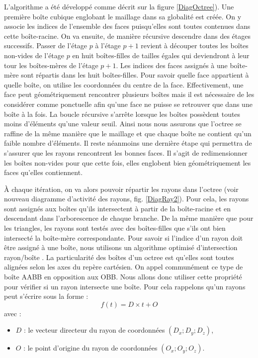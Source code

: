 L'algorithme a été développé comme décrit sur la figure \ref{DiagOctree}). Une première boîte cubique englobant le maillage dans sa globalité est créée. On y associe les indices de l'ensemble des faces puisqu'elles sont toutes contenues dans cette boîte-racine. On va ensuite, de manière récursive descendre dans des étages successifs. Passer de l'étage $p$ à l'étage $p+1$ revient à découper toutes les boîtes non-vides de l'étage $p$ en huit boîtes-filles de tailles égales qui deviendront à leur tour les boîtes-mères de l'étage $p+1$. Les indices des faces assignés à une boîte-mère sont répartis dans les huit boîtes-filles. Pour savoir quelle face appartient à quelle boîte, on utilise les coordonnées du centre de la face. Effectivement, une face peut géométriquement rencontrer plusieurs boîtes mais il est nécessaire de les considérer comme ponctuelle afin qu'une face ne puisse se retrouver que dans une boîte à la fois. La boucle récursive s'arrête lorsque les boîtes possèdent toutes moins d'éléments qu'une valeur seuil. Ainsi nous nous assurons que l'\gls{octree} se raffine de la même manière que le maillage et que chaque boîte ne contient qu'un faible nombre d'éléments. Il reste néanmoins une dernière étape qui permettra de s'assurer que les rayons rencontrent les bonnes faces. Il s'agit de redimensionner les boîtes non-vides pour que cette fois, elles englobent bien géométriquement les faces qu'elles contiennent.


À chaque itération, on va alors pouvoir répartir les rayons dans l'\gls{octree} (voir nouveau diagramme d'activité des rayons, fig. \ref{DiagRay2}). Pour cela, les rayons sont assignés aux boîtes qu'ils intersectent à partir de la boîte-racine et en descendant dans l'arborescence de chaque branche. De la même manière que pour les triangles, les rayons sont testés avec des boîtes-filles que s'ils ont bien intersecté la boîte-mère correspondante. Pour savoir si l'indice d'un rayon doit être assigné à une boîte, nous utilisons un algorithme optimisé d'intersection rayon/boîte \cite{AABB}. La particularité des boîtes d'un \gls{octree} est qu'elles sont toutes alignées selon les axes du repère cartésien. On appel communément ce type de boîte \gls{AABB} en opposition aux \gls{OBB}. Nous allons donc utiliser cette propriété pour vérifier si un rayon intersecte une boîte. Pour cela rappelons qu'un rayons peut s'écrire sous la forme : 
\begin{equation}
f(t) = D \times t + O
\end{equation}
avec :
\begin{itemize}
\item $D$ : le vecteur directeur du rayon de coordonnées $(D_x ; D_y ; D_z)$,
\item $O$ : le point d'origine du rayon de coordonnées $(O_x ; O_y ; O_z)$.
\end{itemize}

